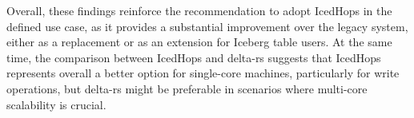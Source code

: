 Overall, these findings reinforce the recommendation to adopt IcedHops in the defined use case, as it provides a substantial improvement over the legacy system, either as a replacement or as an extension for Iceberg table users. At the same time, the comparison between IcedHops and delta-rs suggests that IcedHops represents overall a better option for single-core machines, particularly for write operations, but delta-rs might be preferable in scenarios where multi-core scalability is crucial.